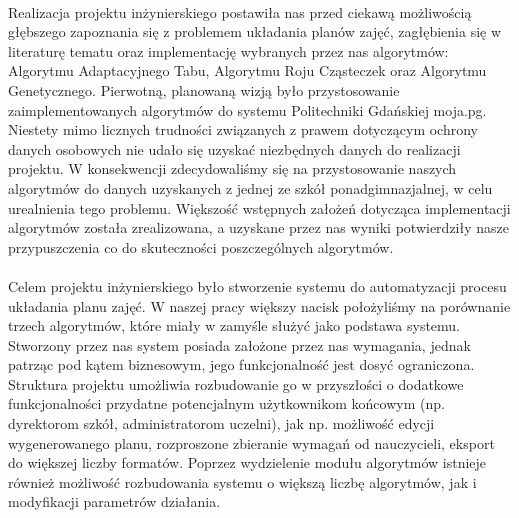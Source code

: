 \paragraph{}Realizacja projektu inżynierskiego postawiła nas przed ciekawą możliwością głębszego zapoznania się z problemem układania planów zajęć, zagłębienia się w literaturę tematu oraz implementację wybranych przez nas algorytmów: Algorytmu Adaptacyjnego Tabu, Algorytmu Roju Cząsteczek oraz Algorytmu Genetycznego.  Pierwotną, planowaną wizją było przystosowanie zaimplementowanych algorytmów do systemu Politechniki Gdańskiej moja.pg. Niestety mimo licznych trudności związanych z prawem dotyczącym ochrony danych osobowych nie udało się uzyskać niezbędnych danych do realizacji projektu. W konsekwencji zdecydowaliśmy się na przystosowanie naszych algorytmów do danych uzyskanych z jednej ze szkół ponadgimnazjalnej, w celu urealnienia tego problemu. Większość  wstępnych założeń dotycząca implementacji algorytmów została zrealizowana, a uzyskane przez nas wyniki potwierdziły nasze przypuszczenia co do skuteczności poszczególnych algorytmów. 
\paragraph{}Celem projektu inżynierskiego było stworzenie systemu do automatyzacji procesu układania planu zajęć. W naszej pracy większy nacisk położyliśmy na porównanie trzech algorytmów, które miały w zamyśle służyć jako podstawa systemu. Stworzony przez nas system posiada założone przez nas wymagania, jednak patrząc pod kątem biznesowym, jego funkcjonalność jest dosyć ograniczona. Struktura projektu umożliwia rozbudowanie go w przyszłości o dodatkowe funkcjonalności przydatne potencjalnym użytkownikom końcowym (np. dyrektorom szkół, administratorom uczelni), jak np. możliwość edycji wygenerowanego planu, rozproszone zbieranie wymagań od nauczycieli, eksport do większej liczby formatów. Poprzez wydzielenie modułu algorytmów istnieje również możliwość rozbudowania systemu o większą liczbę algorytmów, jak i modyfikacji parametrów działania. 

